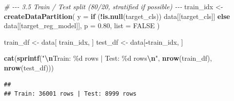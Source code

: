\documentclass[
]{article}
\newenvironment{Shaded}{\begin{snugshade}}{\end{snugshade}}
\newcommand{\AttributeTok}[1]{\textcolor[rgb]{0.13,0.29,0.53}{#1}}
\newcommand{\CommentTok}[1]{\textcolor[rgb]{0.56,0.35,0.01}{\textit{#1}}}
\newcommand{\ConstantTok}[1]{\textcolor[rgb]{0.56,0.35,0.01}{#1}}
\newcommand{\ControlFlowTok}[1]{\textcolor[rgb]{0.13,0.29,0.53}{\textbf{#1}}}
\newcommand{\FloatTok}[1]{\textcolor[rgb]{0.00,0.00,0.81}{#1}}
\newcommand{\FunctionTok}[1]{\textcolor[rgb]{0.13,0.29,0.53}{\textbf{#1}}}
\newcommand{\NormalTok}[1]{#1}
\newcommand{\OtherTok}[1]{\textcolor[rgb]{0.56,0.35,0.01}{#1}}
\newcommand{\SpecialCharTok}[1]{\textcolor[rgb]{0.81,0.36,0.00}{\textbf{#1}}}
\newcommand{\StringTok}[1]{\textcolor[rgb]{0.31,0.60,0.02}{#1}}
\begin{document}
\begin{Shaded}
\begin{Highlighting}[]
\CommentTok{\# {-}{-}{-} 3.5  Train / Test split (80/20, stratified if possible) {-}{-}{-}}
\NormalTok{train\_idx }\OtherTok{\textless{}{-}} \FunctionTok{createDataPartition}\NormalTok{(}
  \AttributeTok{y     =} \ControlFlowTok{if}\NormalTok{ (}\SpecialCharTok{!}\FunctionTok{is.null}\NormalTok{(target\_cls)) data[[target\_cls]] }\ControlFlowTok{else}\NormalTok{ data[[target\_reg\_model]],}
  \AttributeTok{p     =} \FloatTok{0.80}\NormalTok{,}
  \AttributeTok{list  =} \ConstantTok{FALSE}
\NormalTok{)}

\NormalTok{train\_df }\OtherTok{\textless{}{-}}\NormalTok{ data[ train\_idx, ]}
\NormalTok{test\_df  }\OtherTok{\textless{}{-}}\NormalTok{ data[}\SpecialCharTok{{-}}\NormalTok{train\_idx, ]}

\FunctionTok{cat}\NormalTok{(}\FunctionTok{sprintf}\NormalTok{(}\StringTok{"}\SpecialCharTok{\textbackslash{}n}\StringTok{Train: \%d rows | Test: \%d rows}\SpecialCharTok{\textbackslash{}n}\StringTok{"}\NormalTok{, }\FunctionTok{nrow}\NormalTok{(train\_df), }\FunctionTok{nrow}\NormalTok{(test\_df)))}
\end{Highlighting}
\end{Shaded}

\begin{verbatim}
## 
## Train: 36001 rows | Test: 8999 rows
\end{verbatim}
\end{document}
